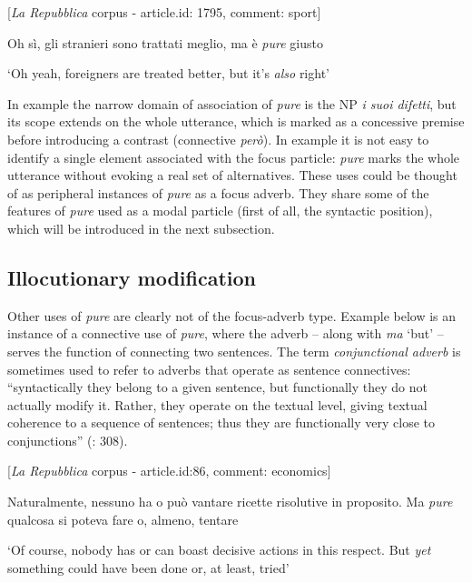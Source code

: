 \ea%
    \label{ex:key:18}

          [\textit{La Repubblica} corpus - article.id: 1795, comment: sport]

Oh sì, gli stranieri sono trattati meglio, ma è \textit{pure} giusto

\glt ‘Oh yeah, foreigners are treated better, but it’s \textit{also} right’
    \z

In example  the narrow domain of association of \textit{pure} is the NP \textit{i suoi difetti}, but its scope extends on the whole utterance, which is marked as a concessive premise before introducing a contrast (connective \textit{però}). In example  it is not easy to identify a single element associated with the focus particle: \textit{pure} marks the whole utterance without evoking a real set of alternatives. These uses could be thought of as peripheral instances of \textit{pure} as a focus adverb. They share some of the features of \textit{pure} used as a modal particle (first of all, the syntactic position), which will be introduced in the next subsection.

\subsection{Illocutionary modification}
\hypertarget{Toc124860650}{}
Other uses of \textit{pure} are clearly not of the focus-adverb type. Example  below is an instance of a connective use of \textit{pure}, where the adverb – along with \textit{ma} ‘but’ – serves the function of connecting two sentences. The term \textit{conjunctional adverb} is sometimes used to refer to adverbs that operate as sentence connectives: “syntactically they belong to a given sentence, but functionally they do not actually modify it. Rather, they operate on the textual level, giving textual coherence to a sequence of sentences; thus they are functionally very close to conjunctions” (\citealt{RamatRicca1994}: 308).

\ea%
    \label{ex:key:19}

          [\textit{La Repubblica} corpus - article.id:86, comment: economics]

Naturalmente, nessuno ha o può vantare ricette risolutive in proposito. Ma \textit{pure} qualcosa si poteva fare o, almeno, tentare

\glt ‘Of course, nobody has or can boast decisive actions in this respect. But \textit{yet} something could have been done or, at least, tried’
    \z

